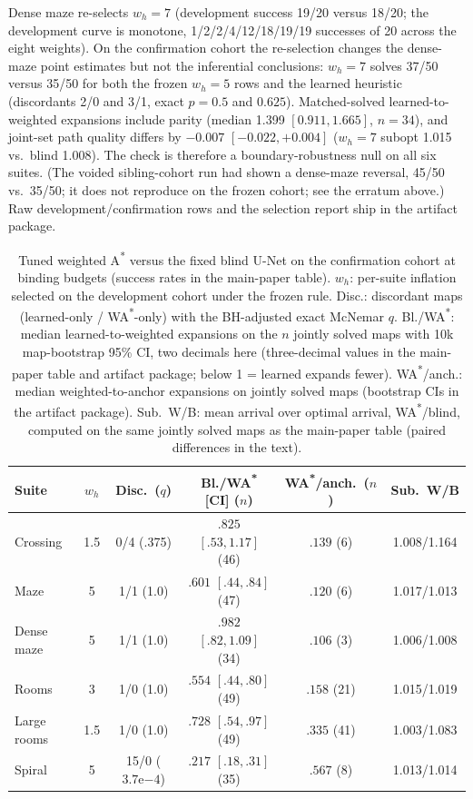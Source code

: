 \documentclass[letterpaper]{article} %
\begin{document}
Dense maze re-selects $w_h{=}7$ (development success 19/20 versus 18/20; the development curve is monotone, 1/2/2/4/12/18/19/19 successes of 20 across the eight weights). On the confirmation cohort the re-selection changes the dense-maze point estimates but not the inferential conclusions: $w_h{=}7$ solves 37/50 versus 35/50 for both the frozen $w_h{=}5$ rows and the learned heuristic (discordants 2/0 and 3/1, exact $p{=}0.5$ and $0.625$). Matched-solved learned-to-weighted expansions include parity (median 1.399 $[0.911, 1.665]$, $n{=}34$), and joint-set path quality differs by $-0.007$ $[-0.022, +0.004]$ ($w_h{=}7$ subopt 1.015 vs.\ blind 1.008). The check is therefore a boundary-robustness null on all six suites. (The voided sibling-cohort run had shown a dense-maze reversal, 45/50 vs.\ 35/50; it does not reproduce on the frozen cohort; see the erratum above.) Raw development/confirmation rows and the selection report ship in the artifact package.

\begin{table}[t]
\centering
\small
\setlength{\tabcolsep}{1.3pt}
\begin{tabular}{@{}lccccc@{}}
\toprule
Suite & $w_h$ & Disc.\ ($q$) & Bl./WA\textsuperscript{*} [CI] ($n$) & WA\textsuperscript{*}/anch.\ ($n$) & Sub.\ W/B \\
\midrule
Crossing & 1.5 & 0/4 (.375) & $.825$ $[.53,1.17]$ (46) & $.139$ (6) & 1.008/1.164 \\
Maze & 5 & 1/1 (1.0) & $.601$ $[.44,.84]$ (47) & $.120$ (6) & 1.017/1.013 \\
Dense maze & 5 & 1/1 (1.0) & $.982$ $[.82,1.09]$ (34) & $.106$ (3) & 1.006/1.008 \\
Rooms & 3 & 1/0 (1.0) & $.554$ $[.44,.80]$ (49) & $.158$ (21) & 1.015/1.019 \\
Large rooms & 1.5 & 1/0 (1.0) & $.728$ $[.54,.97]$ (49) & $.335$ (41) & 1.003/1.083 \\
Spiral & 5 & 15/0 ($3.7\mathrm{e}{-4}$) & $.217$ $[.18,.31]$ (35) & $.567$ (8) & 1.013/1.014 \\
\bottomrule
\end{tabular}
\caption{Tuned weighted A\textsuperscript{*} versus the fixed blind U-Net on the confirmation cohort at binding budgets (success rates in the main-paper table). $w_h$: per-suite inflation selected on the development cohort under the frozen rule. Disc.: discordant maps (learned-only / WA\textsuperscript{*}-only) with the BH-adjusted exact McNemar $q$. Bl./WA\textsuperscript{*}: median learned-to-weighted expansions on the $n$ jointly solved maps with 10k map-bootstrap 95\% CI, two decimals here (three-decimal values in the main-paper table and artifact package; below 1 = learned expands fewer). WA\textsuperscript{*}/anch.: median weighted-to-anchor expansions on jointly solved maps (bootstrap CIs in the artifact package). Sub.\ W/B: mean arrival over optimal arrival, WA\textsuperscript{*}/blind, computed on the same jointly solved maps as the main-paper table (paired differences in the text).}
\label{tab:wastar}
\end{table}
\end{document}

